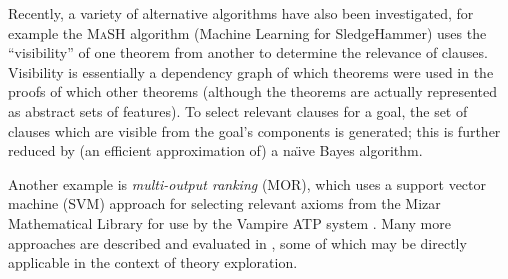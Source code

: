 Recently, a variety of alternative algorithms have also been investigated, for
example the \textsc{MaSH} algorithm (Machine Learning for SledgeHammer)
\cite{kuhlwein2013mash} uses the ``visibility'' of one theorem from another to
determine the relevance of clauses. Visibility is essentially a dependency graph
of which theorems were used in the proofs of which other theorems (although the
theorems are actually represented as abstract sets of features). To select
relevant clauses for a goal, the set of clauses which are visible from the
goal's components is generated; this is further reduced by (an efficient
approximation of) a na\"{\i}ve Bayes algorithm.

Another example is \emph{multi-output ranking} (MOR), which uses a support
vector machine (SVM) approach for selecting relevant axioms from the Mizar
Mathematical Library for use by the Vampire ATP system
\cite{alama2014premise}. Many more approaches are described and evaluated in
\cite{kuhlwein2012overview}, some of which may be directly applicable in the
context of theory exploration.

